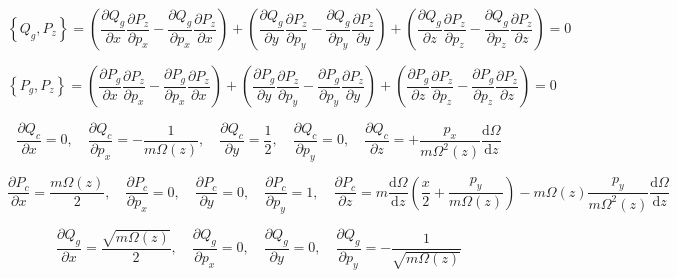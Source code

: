 \begin{equation}
    \label{H-51}
    \left\{Q_g,P_z\right\}=\left(\frac{\partial Q_g}{\partial x}\frac{\partial P_z}{\partial p_x}-\frac{\partial Q_g}{\partial p_x}\frac{\partial P_z}{\partial x}\right)+\left(\frac{\partial Q_g}{\partial y}\frac{\partial P_z}{\partial p_y}-\frac{\partial Q_g}{\partial p_y}\frac{\partial P_z}{\partial y}\right)+\left(\frac{\partial Q_g}{\partial z}\frac{\partial P_z}{\partial p_z}-\frac{\partial Q_g}{\partial p_z}\frac{\partial P_z}{\partial z}\right)=0
\end{equation}

\begin{equation}
    \label{H-52}
    \left\{P_g,P_z\right\}=\left(\frac{\partial P_g}{\partial x}\frac{\partial P_z}{\partial p_x}-\frac{\partial P_g}{\partial p_x}\frac{\partial P_z}{\partial x}\right)+\left(\frac{\partial P_g}{\partial y}\frac{\partial P_z}{\partial p_y}-\frac{\partial P_g}{\partial p_y}\frac{\partial P_z}{\partial y}\right)+\left(\frac{\partial P_g}{\partial z}\frac{\partial P_z}{\partial p_z}-\frac{\partial P_g}{\partial p_z}\frac{\partial P_z}{\partial z}\right)=0
\end{equation}

\begin{equation*}
    \frac{\partial Q_c}{\partial x}=0,\quad \frac{\partial Q_c}{\partial p_x}=-\frac{1}{m\Omega(z)},\quad \frac{\partial Q_c}{\partial y}=\frac{1}{2},\quad \frac{\partial Q_c}{\partial p_y}=0,\quad \frac{\partial Q_c}{\partial z}=+\frac{p_x}{m\Omega^2(z)}\frac{\mathrm{d}\Omega}{\mathrm{d}z}
\end{equation*}

\begin{equation*}
    \frac{\partial P_c}{\partial x}=\frac{m\Omega(z)}{2},\quad \frac{\partial P_c}{\partial p_x}=0,\quad \frac{\partial P_c}{\partial y}=0,\quad \frac{\partial P_c}{\partial p_y}=1,\quad \frac{\partial P_c}{\partial z}=m \frac{\mathrm{d}\Omega}{\mathrm{d}z}\left(\frac{x}{2}+\frac{p_y}{m\Omega(z)}\right)-m\Omega(z)\frac{p_y}{m\Omega^2(z)}\frac{\mathrm{d}\Omega}{\mathrm{d}z}
\end{equation*}

\begin{equation*}
    \frac{\partial Q_g}{\partial x}=\frac{\sqrt{m\Omega(z)}}{2},\quad \frac{\partial Q_g}{\partial p_x}=0,\quad \frac{\partial Q_g}{\partial y}=0,\quad \frac{\partial Q_g}{\partial p_y}=-\frac{1}{\sqrt{m\Omega(z)}}
\end{equation*}

